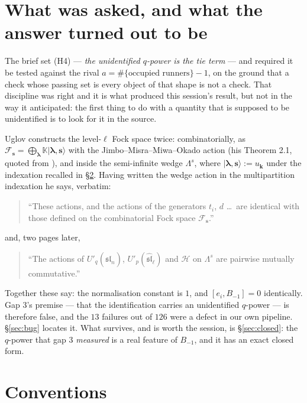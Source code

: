 \documentclass[11pt]{article}
\theoremstyle{definition}
\theoremstyle{remark}
\newcommand{\bl}{\boldsymbol{\lambda}}
\newcommand{\bs}{\mathbf{s}}
\newcommand{\bk}{\mathbf{k}}
\newcommand{\ket}[1]{\lvert #1 \rangle}
\begin{document}
\section{What was asked, and what the answer turned out to be}

The brief set (H4) --- \emph{the unidentified $q$-power is the tie term} --- and required
it be tested against the rival $a=\#\{\text{occupied runners}\}-1$, on the ground that a
check whose passing set is every object of that shape is not a check. That discipline was
right and it is what produced this session's result, but not in the way it anticipated:
the first thing to do with a quantity that is supposed to be unidentified is to look for
it in the source.

Uglov constructs the level-$\ell$ Fock space twice: combinatorially, as
$\mathcal F_{\bs}=\bigoplus_{\bl}\mathbb K\ket{\bl,\bs}$ with the
Jimbo--Misra--Miwa--Okado action (his Theorem 2.1, quoted from \cite{J,Fo}), and inside
the semi-infinite wedge $\Lambda^{s}$, where $\ket{\bl,\bs}:=u_{\bk}$ under the
indexation recalled in \S\ref{sec:conv}. Having written the wedge action in the
multipartition indexation he says, verbatim:

\begin{quote}
``These actions, and the actions of the generators $t_i$, $d$ \dots\ are identical with
those defined on the combinatorial Fock space $\mathcal F_{\bs}$.''
\end{quote}

\noindent and, two pages later,

\begin{quote}
``The actions of $U'_q(\widehat{\mathfrak{sl}}_n)$, $U'_p(\widehat{\mathfrak{sl}}_\ell)$
and $\mathcal H$ on $\Lambda^{s}$ are pairwise mutually commutative.''
\end{quote}

Together these say: the normalisation constant is $1$, and $[e_i,B_{-1}]=0$ identically.
Gap 3's premise --- that the identification carries an unidentified $q$-power --- is
therefore false, and the $13$ failures out of $126$ were a defect in our own pipeline.
\S\ref{sec:bug} locates it. What survives, and is worth the session, is
\S\ref{sec:closed}: the $q$-power that gap 3 \emph{measured} is a real feature of
$B_{-1}$, and it has an exact closed form.

\section{Conventions}\label{sec:conv}
\end{document}
